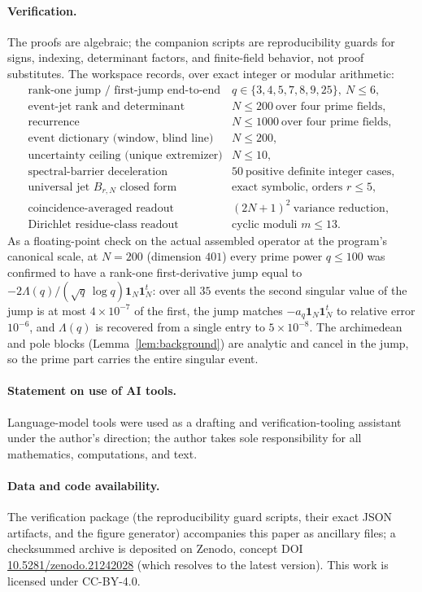 \documentclass[11pt]{article}
\theoremstyle{plain}
\theoremstyle{definition}
\theoremstyle{remark}
\newcommand{\one}{\mathbf 1}
\newcommand{\Lam}{\Lambda}
\begin{document}
\paragraph{Verification.}
The proofs are algebraic; the companion scripts are reproducibility guards for
signs, indexing, determinant factors, and finite-field behavior, not proof
substitutes. The workspace records, over exact integer or modular arithmetic:
\[
\begin{array}{ll}
\text{rank-one jump / first-jump end-to-end} & q\in\{3,4,5,7,8,9,25\},\ N\le6,\\
\text{event-jet rank and determinant} & N\le200\ \text{over four prime fields},\\
\text{recurrence} & N\le1000\ \text{over four prime fields},\\
\text{event dictionary (window, blind line)} & N\le200,\\
\text{uncertainty ceiling (unique extremizer)} & N\le10,\\
\text{spectral-barrier deceleration} & 50\ \text{positive definite integer cases},\\
\text{universal jet }B_{r,N}\text{ closed form} & \text{exact symbolic, orders }r\le5,\\
\text{coincidence-averaged readout} & (2N+1)^2\ \text{variance reduction},\\
\text{Dirichlet residue-class readout} & \text{cyclic moduli }m\le13.
\end{array}
\]
As a floating-point check on the actual assembled operator at the program's
canonical scale, at $N=200$ (dimension $401$) every prime power $q\le100$ was
confirmed to have a rank-one first-derivative jump equal to
$-2\Lam(q)/(\sqrt q\,\log q)\one_N\one_N^t$: over all $35$ events the second
singular value of the jump is at most $4\times10^{-7}$ of the first, the jump
matches $-a_q\one_N\one_N^t$ to relative error $10^{-6}$, and $\Lam(q)$ is
recovered from a single entry to $5\times10^{-8}$. The archimedean and pole
blocks (Lemma~\ref{lem:background}) are analytic and cancel in the jump, so the
prime part carries the entire singular event.

\paragraph{Statement on use of AI tools.}
Language-model tools were used as a drafting and verification-tooling assistant
under the author's direction; the author takes sole responsibility for all
mathematics, computations, and text.

\paragraph{Data and code availability.}
The verification package (the reproducibility guard scripts, their exact JSON
artifacts, and the figure generator) accompanies this paper as ancillary files;
a checksummed archive is deposited on Zenodo, concept DOI
\href{https://doi.org/10.5281/zenodo.21242028}{10.5281/zenodo.21242028} (which
resolves to the latest version). This work is licensed under CC-BY-4.0.

{\footnotesize\raggedright


}
\end{document}
